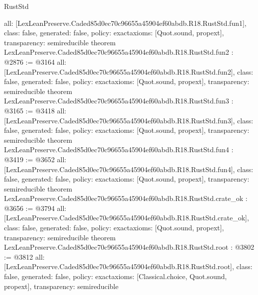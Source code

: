 \begin{lexlean}{RustStd}
\begin{coremodule}
{  all: [LexLeanPreserve.Caded85d0ec70c96655a45904ef60abdb.R18.RustStd.fun1],
  class: false,
  generated: false,
  policy: exact{axioms: [Quot.sound, propext]},
  transparency: semireducible
}
theorem LexLeanPreserve.Caded85d0ec70c96655a45904ef60abdb.R18.RustStd.fun2 : @2876 := @3164 {
  all: [LexLeanPreserve.Caded85d0ec70c96655a45904ef60abdb.R18.RustStd.fun2],
  class: false,
  generated: false,
  policy: exact{axioms: [Quot.sound, propext]},
  transparency: semireducible
}
theorem LexLeanPreserve.Caded85d0ec70c96655a45904ef60abdb.R18.RustStd.fun3 : @3165 := @3418 {
  all: [LexLeanPreserve.Caded85d0ec70c96655a45904ef60abdb.R18.RustStd.fun3],
  class: false,
  generated: false,
  policy: exact{axioms: [Quot.sound, propext]},
  transparency: semireducible
}
theorem LexLeanPreserve.Caded85d0ec70c96655a45904ef60abdb.R18.RustStd.fun4 : @3419 := @3652 {
  all: [LexLeanPreserve.Caded85d0ec70c96655a45904ef60abdb.R18.RustStd.fun4],
  class: false,
  generated: false,
  policy: exact{axioms: [Quot.sound, propext]},
  transparency: semireducible
}
theorem LexLeanPreserve.Caded85d0ec70c96655a45904ef60abdb.R18.RustStd.crate_ok : @3656 := @3794 {
  all: [LexLeanPreserve.Caded85d0ec70c96655a45904ef60abdb.R18.RustStd.crate_ok],
  class: false,
  generated: false,
  policy: exact{axioms: [Quot.sound, propext]},
  transparency: semireducible
}
theorem LexLeanPreserve.Caded85d0ec70c96655a45904ef60abdb.R18.RustStd.root : @3802 := @3812 {
  all: [LexLeanPreserve.Caded85d0ec70c96655a45904ef60abdb.R18.RustStd.root],
  class: false,
  generated: false,
  policy: exact{axioms: [Classical.choice, Quot.sound, propext]},
  transparency: semireducible
}


\end{coremodule}
\end{lexlean}
